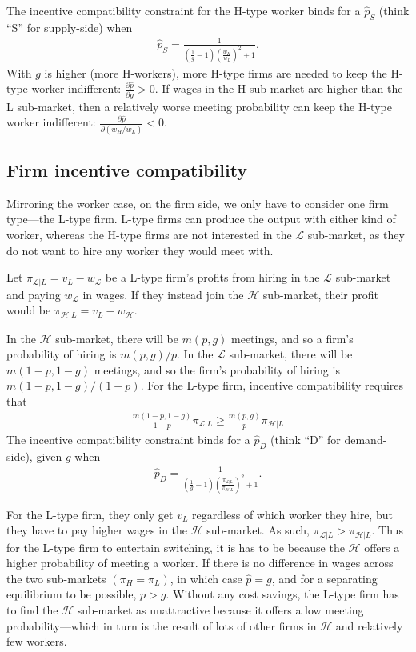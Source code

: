 \documentclass[12pt]{article}
\newcommand{\Lsm}{$\mathcal{L}$}
\newcommand{\Hsm}{$\mathcal{H}$}
\begin{document}
The incentive compatibility constraint for the H-type worker binds for a $\hat{p}_S$ (think ``S'' for supply-side) when
\begin{align*}
  \hat{p}_S = \frac{1}{\left(\frac{1}{g} - 1\right) \left(\frac{w_H}{w_L}\right)^2 + 1}.
\end{align*}
With $g$ is higher (more H-workers), more H-type firms are needed to keep the H-type worker indifferent: $\frac{\partial \hat{p}}{\partial g} > 0$. 
If wages in the H sub-market are higher than the L sub-market, then a relatively worse meeting probability can keep the H-type worker indifferent: $\frac{\partial \hat{p}}{\partial (w_H/w_L)} < 0$.  

\subsection{Firm incentive compatibility}
Mirroring the worker case, on the firm side, we only have to consider one firm type---the L-type firm. 
L-type firms can produce the output with either kind of worker, whereas the H-type firms are not interested in the \Lsm{} sub-market, as they do not want to hire any worker they would meet with.

Let $\pi_{\mathcal{L}|L} = v_L - w_{\mathcal{L}}$ be a L-type firm's profits from hiring in the \Lsm{} sub-market and paying $w_\mathcal{L}$ in wages. 
If they instead join the \Hsm{} sub-market, their profit would be $\pi_{\mathcal{H}|L} = v_L - w_{\mathcal{H}}$. 

In the \Hsm{} sub-market, there will be $m(p, g)$ meetings, and so a firm's probability of hiring is $m(p, g)/p$.
In the \Lsm{} sub-market, there will be $m(1 - p, 1 - g)$ meetings, and so the firm's probability of hiring is $m(1 - p, 1 - g)/(1 - p)$.
For the L-type firm, incentive compatibility requires that 
\begin{align*}
  \frac{m(1 - p, 1 - g)}{1 - p} \pi_{\mathcal{L}|L} \ge \frac{m(p, g)}{p} \pi_{\mathcal{H}|L}
\end{align*}
The incentive compatibility constraint binds for a $\hat{p}_D$ (think ``D'' for demand-side), given $g$ when
\begin{align*}
 \hat{p}_D = \frac{1}{\left(\frac{1}{g} - 1\right) \left(\frac{ \pi_{\mathcal{L}|L}}{\pi_{\mathcal{H}|L}} \right)^2 + 1}.
\end{align*}

For the L-type firm, they only get $v_L$ regardless of which worker they hire, but they have to pay higher wages in the \Hsm{} sub-market.
As such, $\pi_{\mathcal{L}|L} > \pi_{\mathcal{H}|L}$.
Thus for the L-type firm to entertain switching, it is has to be because the \Hsm{} offers a higher probability of meeting a worker. 
If there is no difference in wages across the two sub-markets $(\pi_H = \pi_L)$, in which case $\hat{p} = g$, and for a separating equilibrium to be possible, $p > g$.
Without any cost savings, the L-type firm has to find the \Hsm{} sub-market as unattractive because it offers a low meeting probability---which in turn is the result of lots of other firms in \Hsm{} and relatively few workers.  
\end{document}
